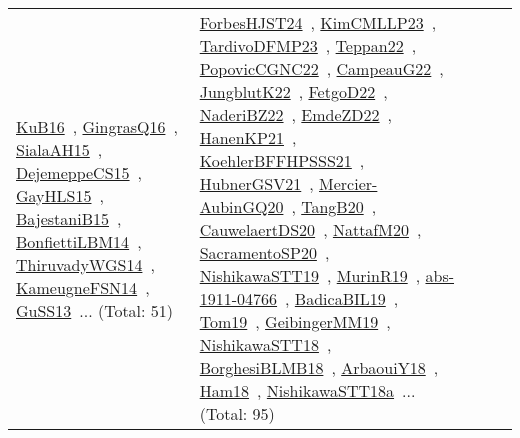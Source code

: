 {\begin{longtable}{lp{3cm}>{\raggedright\arraybackslash}p{6cm}>{\raggedright\arraybackslash}p{6cm}>{\raggedright\arraybackslash}p{8cm}}
\href{works/KuB16.pdf}{KuB16}~\cite{KuB16}, \href{works/GingrasQ16.pdf}{GingrasQ16}~\cite{GingrasQ16}, \href{works/SialaAH15.pdf}{SialaAH15}~\cite{SialaAH15}, \href{works/DejemeppeCS15.pdf}{DejemeppeCS15}~\cite{DejemeppeCS15}, \href{works/GayHLS15.pdf}{GayHLS15}~\cite{GayHLS15}, \href{works/BajestaniB15.pdf}{BajestaniB15}~\cite{BajestaniB15}, \href{works/BonfiettiLBM14.pdf}{BonfiettiLBM14}~\cite{BonfiettiLBM14}, \href{works/ThiruvadyWGS14.pdf}{ThiruvadyWGS14}~\cite{ThiruvadyWGS14}, \href{works/KameugneFSN14.pdf}{KameugneFSN14}~\cite{KameugneFSN14}, \href{works/GuSS13.pdf}{GuSS13}~\cite{GuSS13}... (Total: 51) & \href{works/ForbesHJST24.pdf}{ForbesHJST24}~\cite{ForbesHJST24}, \href{works/KimCMLLP23.pdf}{KimCMLLP23}~\cite{KimCMLLP23}, \href{works/TardivoDFMP23.pdf}{TardivoDFMP23}~\cite{TardivoDFMP23}, \href{works/Teppan22.pdf}{Teppan22}~\cite{Teppan22}, \href{works/PopovicCGNC22.pdf}{PopovicCGNC22}~\cite{PopovicCGNC22}, \href{works/CampeauG22.pdf}{CampeauG22}~\cite{CampeauG22}, \href{works/JungblutK22.pdf}{JungblutK22}~\cite{JungblutK22}, \href{works/FetgoD22.pdf}{FetgoD22}~\cite{FetgoD22}, \href{works/NaderiBZ22.pdf}{NaderiBZ22}~\cite{NaderiBZ22}, \href{works/EmdeZD22.pdf}{EmdeZD22}~\cite{EmdeZD22}, \href{works/HanenKP21.pdf}{HanenKP21}~\cite{HanenKP21}, \href{works/KoehlerBFFHPSSS21.pdf}{KoehlerBFFHPSSS21}~\cite{KoehlerBFFHPSSS21}, \href{works/HubnerGSV21.pdf}{HubnerGSV21}~\cite{HubnerGSV21}, \href{works/Mercier-AubinGQ20.pdf}{Mercier-AubinGQ20}~\cite{Mercier-AubinGQ20}, \href{works/TangB20.pdf}{TangB20}~\cite{TangB20}, \href{works/CauwelaertDS20.pdf}{CauwelaertDS20}~\cite{CauwelaertDS20}, \href{works/NattafM20.pdf}{NattafM20}~\cite{NattafM20}, \href{works/SacramentoSP20.pdf}{SacramentoSP20}~\cite{SacramentoSP20}, \href{works/NishikawaSTT19.pdf}{NishikawaSTT19}~\cite{NishikawaSTT19}, \href{works/MurinR19.pdf}{MurinR19}~\cite{MurinR19}, \href{works/abs-1911-04766.pdf}{abs-1911-04766}~\cite{abs-1911-04766}, \href{works/BadicaBIL19.pdf}{BadicaBIL19}~\cite{BadicaBIL19}, \href{works/Tom19.pdf}{Tom19}~\cite{Tom19}, \href{works/GeibingerMM19.pdf}{GeibingerMM19}~\cite{GeibingerMM19}, \href{works/NishikawaSTT18.pdf}{NishikawaSTT18}~\cite{NishikawaSTT18}, \href{works/BorghesiBLMB18.pdf}{BorghesiBLMB18}~\cite{BorghesiBLMB18}, \href{works/ArbaouiY18.pdf}{ArbaouiY18}~\cite{ArbaouiY18}, \href{works/Ham18.pdf}{Ham18}~\cite{Ham18}, \href{works/NishikawaSTT18a.pdf}{NishikawaSTT18a}~\cite{NishikawaSTT18a}... (Total: 95)\\

\end{longtable}}
